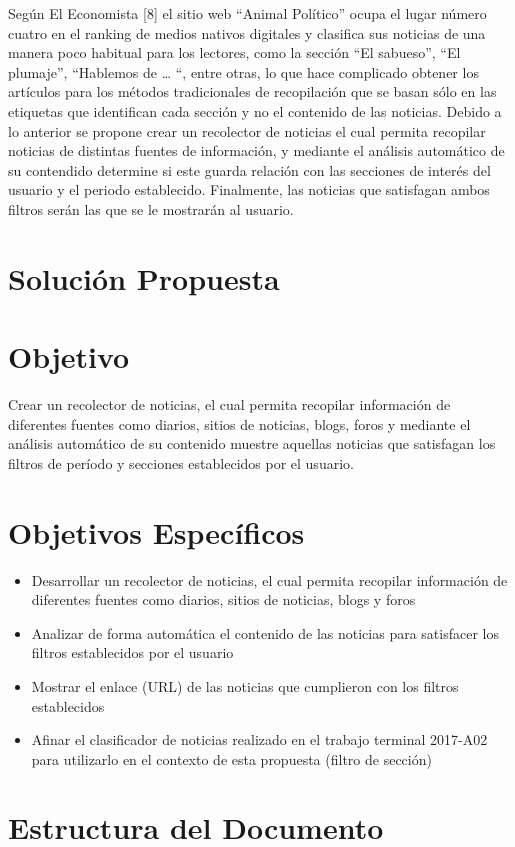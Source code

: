 Según El Economista [8] el sitio web “Animal Político” ocupa el lugar número cuatro en el ranking de medios nativos digitales y clasifica sus noticias de una manera poco habitual para los lectores, como la sección “El sabueso”, “El plumaje”, “Hablemos de … “, entre otras, lo que hace complicado obtener los artículos para los métodos tradicionales de recopilación que se basan sólo en las etiquetas que identifican cada sección y no el contenido de las noticias.
Debido a lo anterior se propone crear un recolector de noticias el cual permita recopilar noticias de distintas fuentes de información, y mediante el análisis automático de su contendido determine si este guarda relación con las secciones de interés del usuario y el periodo establecido. Finalmente, las noticias que satisfagan ambos filtros serán las que se le mostrarán al usuario.

\section{Solución Propuesta}

\section{Objetivo}

  Crear un recolector de noticias, el cual permita recopilar información de diferentes fuentes como diarios, sitios de noticias, blogs, foros y mediante el análisis automático de su contenido muestre aquellas noticias que satisfagan los filtros de período y secciones establecidos por el usuario.
  

\section{Objetivos Específicos}
\begin{itemize}
  \item Desarrollar un recolector de noticias, el cual permita recopilar información de diferentes fuentes como diarios, sitios de noticias, blogs y foros
  \item Analizar de forma automática el contenido de las noticias para satisfacer los filtros establecidos por el usuario
  \item Mostrar el enlace (URL) de las noticias que cumplieron con los filtros establecidos
  \item Afinar el clasificador de noticias realizado en el trabajo terminal 2017-A02 para utilizarlo en el contexto de esta propuesta (filtro de sección) 

\end{itemize}
\section{Estructura del Documento}